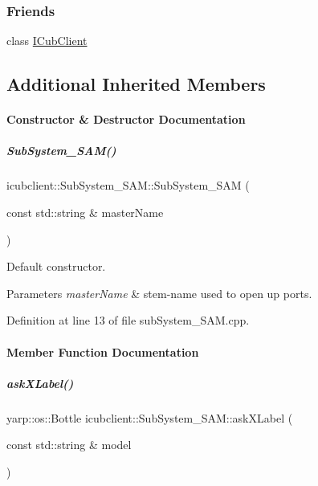 \subsubsection*{Friends}
\begin{DoxyCompactItemize}
\item 
class \hyperlink{group__icubclient__subsystems_a56c42753f30380d8abf4a96bc322b3b0}{I\+Cub\+Client}
\end{DoxyCompactItemize}
\subsection*{Additional Inherited Members}


\paragraph{Constructor \& Destructor Documentation}
\mbox{\label{group__icubclient__subsystems_a5ae7520f8397b1ff4e0018a46e6063fb}} 
\subparagraph{\texorpdfstring{Sub\+System\+\_\+\+S\+A\+M()}{SubSystem\_SAM()}}
{\footnotesize\ttfamily icubclient\+::\+Sub\+System\+\_\+\+S\+A\+M\+::\+Sub\+System\+\_\+\+S\+AM (\begin{DoxyParamCaption}\item[{const std\+::string \&}]{master\+Name }\end{DoxyParamCaption})}



Default constructor. 


\begin{DoxyParams}{Parameters}
{\em master\+Name} & stem-\/name used to open up ports. \\
\hline
\end{DoxyParams}


Definition at line 13 of file sub\+System\+\_\+\+S\+A\+M.\+cpp.



\paragraph{Member Function Documentation}
\mbox{\label{group__icubclient__subsystems_a3191f11027b606edbeaa876606e7cfac}} 
\subparagraph{\texorpdfstring{ask\+X\+Label()}{askXLabel()}}
{\footnotesize\ttfamily yarp\+::os\+::\+Bottle icubclient\+::\+Sub\+System\+\_\+\+S\+A\+M\+::ask\+X\+Label (\begin{DoxyParamCaption}\item[{const std\+::string \&}]{model }\end{DoxyParamCaption})}



